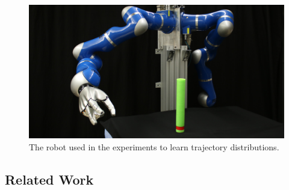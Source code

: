\documentclass[letterpaper, 10 pt, conference]{ieeeconf}  %
\begin{document}
\begin{figure}
\begin{center}
\includegraphics[width=0.8\columnwidth]{IMG_1062_mod2.JPG}
\end{center}
\caption{The robot used in the experiments to learn trajectory distributions.}
\vspace{-1.5em}
\end{figure}


\subsection{Related Work}
\end{document}

